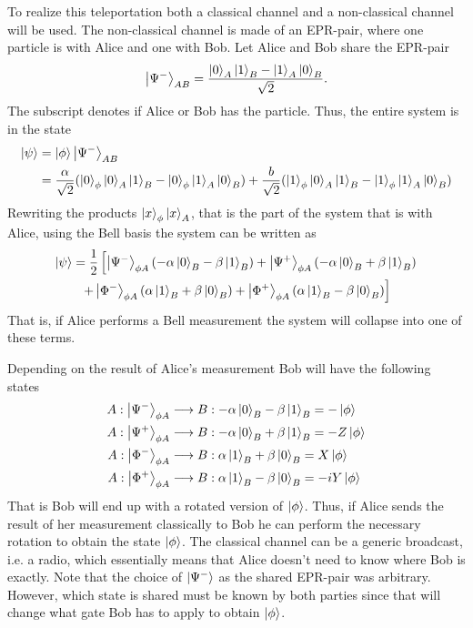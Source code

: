 To realize this teleportation both a classical channel and a non-classical channel will be used. The non-classical channel is made of an EPR-pair, where one particle is with Alice and one with Bob. Let Alice and Bob share the EPR-pair 
\begin{equation}
    \ket{\Psi^-}_{AB} = \frac{\ket{0}_A\ket{1}_B - \ket{1}_A\ket{0}_B}{\sqrt{2}}.
\end{equation}
The subscript denotes if Alice or Bob has the particle. Thus, the entire system is in the state 
\begin{align}
    \ket{\psi} &=\ket{\phi}\ket{\Psi^-}_{AB} \\ &= \frac{\alpha}{\sqrt{2}} (\ket{0}_\phi \ket{0}_A \ket{1}_B - \ket{0}_\phi \ket{1}_A \ket{0}_B) + \frac{b}{\sqrt{2}} (\ket{1}_\phi \ket{0}_A \ket{1}_B - \ket{1}_\phi \ket{1}_A \ket{0}_B)
\end{align}
Rewriting the products $\ket{x}_\phi\ket{x}_A$, that is the part of the system that is with Alice, using the Bell basis the system can be written as 
\begin{multline}
    \ket{\psi} = \frac{1}{2}\left[
        \ket{\Psi^-}_{\phi A} (-\alpha\ket{0}_B - \beta\ket{1}_B)   
        +\ket{\Psi^+}_{\phi A} (-\alpha\ket{0}_B + \beta\ket{1}_B)\right.\\
        \left.+\ket{\Phi^-}_{\phi A} (\alpha\ket{1}_B + \beta\ket{0}_B)
        +\ket{\Phi^+}_{\phi A} (\alpha\ket{1}_B - \beta\ket{0}_B)
        \right]  
\end{multline}
That is, if Alice performs a Bell measurement the system will collapse into one of these terms. \cite{Bennett:1993}

Depending on the result of Alice's measurement Bob will have the following states
\begin{align}
    A: \ket{\Psi^-}_{\phi A} &\longrightarrow B: -\alpha\ket{0}_B - \beta \ket{1}_B = -\ket{\phi}\\
    A: \ket{\Psi^+}_{\phi A} &\longrightarrow B: -\alpha\ket{0}_B + \beta \ket{1}_B = -Z\ket{\phi}\\
    A: \ket{\Phi^-}_{\phi A} &\longrightarrow B: \alpha\ket{1}_B + \beta \ket{0}_B = X\ket{\phi}\\
    A: \ket{\Phi^+}_{\phi A} &\longrightarrow B: \alpha\ket{1}_B - \beta \ket{0}_B = -iY\ket{\phi}\\
\end{align}
That is Bob will end up with a rotated version of $\ket{\phi}$. Thus, if Alice sends the result of her measurement classically to Bob he can perform the necessary rotation to obtain the state $\ket{\phi}$. The classical channel can be a generic broadcast, i.e. a radio, which essentially means that Alice doesn't need to know where Bob is exactly. Note that the choice of $\ket{\Psi^-}$ as the shared EPR-pair was arbitrary. However, which state is shared must be known by both parties since that will change what gate Bob has to apply to obtain $\ket{\phi}$. \cite{Bennett:1993}

